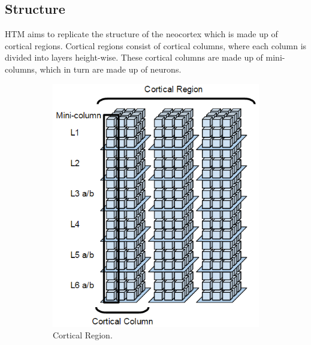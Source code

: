 \subsection{Structure}
HTM aims to replicate the structure of the neocortex which is made up of cortical regions. Cortical regions consist of cortical columns, where each column is divided into layers height-wise. These cortical columns are made up of mini-columns, which in turn are made up of neurons.
\begin{figure}[H]
    \centering
    \begin{subfigure}{0.6\textwidth}
        \includegraphics[width=\textwidth]{resources/related_works/cortical_region.png}
        \caption{Cortical Region.}
    \end{subfigure}
    \hfill
    \begin{subfigure}{0.35\textwidth}

\end{subfigure}
\end{figure}
